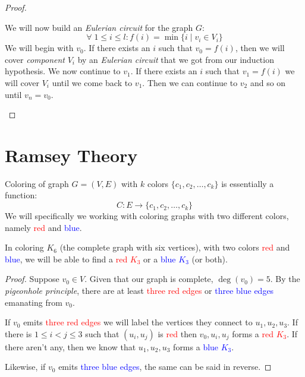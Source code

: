 \documentclass[00_complete]{subfiles}
\begin{document}
\begin{proof}
\begin{enumerate}
\begin{enumerate}[I.]
            We will now build an \emph{Eulerian circuit} for the graph $G$:
            $$\forall \; 1 \leq i \leq l: f(i)=\min\{i \mid v_i \in V_i\}$$
            We will begin with $v_0$. If there exists an $i$ such that $v_0=f(i)$,
            then we will cover \emph{component} $V_i$ by an \emph{Eulerian
            circuit} that we got from our induction hypothesis. We now continue
            to $v_1$. If there exists an $i$ such that $v_1=f(i)$ we will cover
            $V_i$ until we come back to $v_1$. Then we can continue to $v_2$
            and so on until $v_n=v_0$.
            \end{enumerate}
    \end{enumerate}
\end{proof}
\section{Ramsey Theory}

Coloring of graph $G=(V,E)$ with $k$ colors $\{c_1,c_2,\dots,c_k\}$ is
essentially a function:
$$C: E \to \{c_1,c_2,\dots,c_k\}$$
We will specifically we working with coloring graphs with two different colors,
namely \textcolor{red}{red} and \textcolor{blue}{blue}.

\begin{claim}
    In coloring $K_6$ (the complete graph with six vertices), with two colors
    \textcolor{red}{red} and \textcolor{blue}{blue}, we will be able to find a
    \textcolor{red}{red $K_3$} or a \textcolor{blue}{blue $K_3$} (or both).
\end{claim}

\begin{proof}
    Suppose $v_0 \in V$. Given that our graph is complete, $\deg(v_0)=5$. By
    the \emph{pigeonhole principle}, there are at least \textcolor{red}{three red
    edges} or \textcolor{blue}{three blue edges} emanating from $v_0$.

    If $v_0$ emits \textcolor{red}{three red edges} we will label the vertices
    they connect to $u_1,u_2,u_3$. If there is $1 \leq i < j \leq 3$ such that
    $(u_i,u_j)$ is \textcolor{red}{red} then $v_0,u_i,u_j$ forms a
    \textcolor{red}{red $K_3$}. If there aren't any, then we know that
    $u_1,u_2,u_3$ forms a \textcolor{blue}{blue $K_3$}.

    Likewise, if $v_0$ emits \textcolor{blue}{three blue edges}, the same can
    be said in reverse.
\end{proof}
\end{document}
